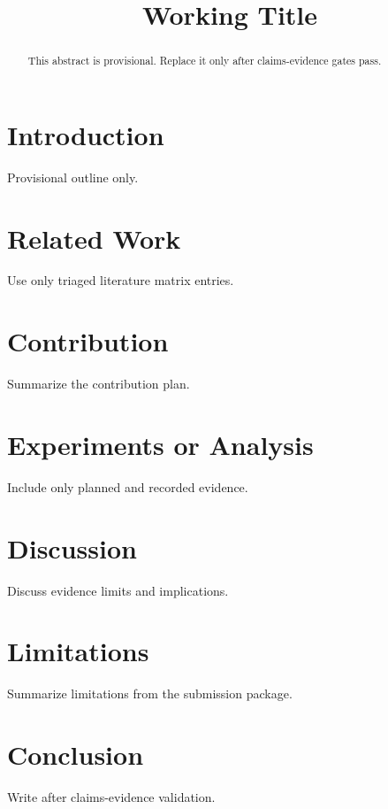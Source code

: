 \documentclass[11pt]{article}
\title{Working Title}
\author{}
\date{}
\begin{document}
\maketitle

\begin{abstract}
This abstract is provisional. Replace it only after claims-evidence gates pass.
\end{abstract}

\section{Introduction}
Provisional outline only.

\section{Related Work}
Use only triaged literature matrix entries.

\section{Contribution}
Summarize the contribution plan.

\section{Experiments or Analysis}
Include only planned and recorded evidence.

\section{Discussion}
Discuss evidence limits and implications.

\section{Limitations}
Summarize limitations from the submission package.

\section{Conclusion}
Write after claims-evidence validation.



\end{document}
